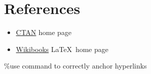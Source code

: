 \documentclass[12pt]{report}
\begin{document}
\section{References}
\label{sec:refs}
\begin{itemize}
\item \href{http://www.ctan.org}{CTAN} home page
\item \href{http://en.wikibooks.org/wiki/LaTeX/}{Wikibooks} \LaTeX\ home page
\end{itemize}


%
%
\clearpage {} %
\renewcommand\baselinestretch{1.5}


%
\begin{appendices}
\%use  command to correctly anchor hyperlinks

\

\end{appendices}
%
%
%
\end{document}
